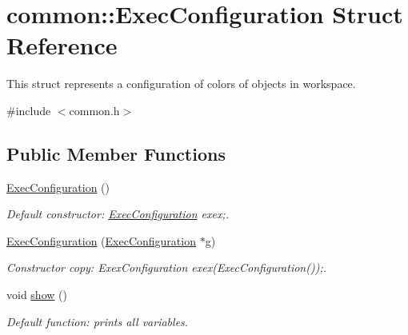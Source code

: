 \hypertarget{structcommon_1_1ExecConfiguration}{}\section{common\+:\+:Exec\+Configuration Struct Reference}
\label{structcommon_1_1ExecConfiguration}


This struct represents a configuration of colors of objects in workspace.  




{\ttfamily \#include $<$common.\+h$>$}

\subsection*{Public Member Functions}
\begin{DoxyCompactItemize}
\item 
\hyperlink{structcommon_1_1ExecConfiguration_ae71329df20ba52327f33287c50663ac1}{Exec\+Configuration} ()\hypertarget{structcommon_1_1ExecConfiguration_ae71329df20ba52327f33287c50663ac1}{}\label{structcommon_1_1ExecConfiguration_ae71329df20ba52327f33287c50663ac1}

\begin{DoxyCompactList}\small\item\em Default constructor\+: \hyperlink{structcommon_1_1ExecConfiguration}{Exec\+Configuration} exex;. \end{DoxyCompactList}\item 
\hyperlink{structcommon_1_1ExecConfiguration_acdd086538b27972751b0b18f78a45e01}{Exec\+Configuration} (\hyperlink{structcommon_1_1ExecConfiguration}{Exec\+Configuration} $\ast$g)\hypertarget{structcommon_1_1ExecConfiguration_acdd086538b27972751b0b18f78a45e01}{}\label{structcommon_1_1ExecConfiguration_acdd086538b27972751b0b18f78a45e01}

\begin{DoxyCompactList}\small\item\em Constructor copy\+: Exex\+Configuration exex(\+Exec\+Configuration());. \end{DoxyCompactList}\item 
void \hyperlink{structcommon_1_1ExecConfiguration_a428c6689fbc17376db7304dd61f3d69b}{show} ()\hypertarget{structcommon_1_1ExecConfiguration_a428c6689fbc17376db7304dd61f3d69b}{}\label{structcommon_1_1ExecConfiguration_a428c6689fbc17376db7304dd61f3d69b}

\begin{DoxyCompactList}\small\item\em Default function\+: prints all variables. \end{DoxyCompactList}\end{DoxyCompactItemize}
